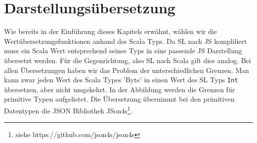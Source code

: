 \documentclass[12pt,a4paper]{report}
\begin{document}

\section{Darstellungsübersetzung}

Wie bereits in der Einführung dieses Kapitels erwähnt, wählen wir die Wertübersetzungsfunktionen anhand des Scala Typs. Da \ac{SL} nach \ac{JS} kompliliert muss ein Scala Wert entsprechend seines Typs in eine passende \ac{JS} Darstellung übersetzt werden. Für die Gegenrichtung, also \ac{SL} nach Scala gilt dies analog. Bei allen Übersetzungen haben wir das Problem der unterschiedlichen Grenzen. Man kann zwar jeden Wert des Scala Types 'Byte' in einen Wert des \ac{SL} Typs \lstinline!Int! übersetzen, aber nicht umgekehrt. In der Abbildung  werden die Grenzen für primitive Typen aufgelistet. Die Übersetzung übernimmt bei den primitiven Datentypen die JSON Bibliothek JSon4s\footnote{siehe https://github.com/json4s/json4s}.
\end{document}
